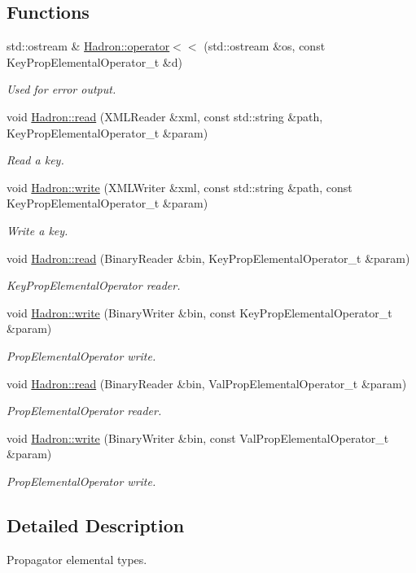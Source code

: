 \subsection*{Functions}
\begin{DoxyCompactItemize}
\item 
std\+::ostream \& \mbox{\hyperlink{namespaceHadron_a8fafc13cc7955fdf6c70c8c72c7b0000}{Hadron\+::operator$<$$<$}} (std\+::ostream \&os, const Key\+Prop\+Elemental\+Operator\+\_\+t \&d)
\begin{DoxyCompactList}\small\item\em Used for error output. \end{DoxyCompactList}\item 
void \mbox{\hyperlink{namespaceHadron_a3b1642acb606c69519cf7dd88a01fbfd}{Hadron\+::read}} (X\+M\+L\+Reader \&xml, const std\+::string \&path, Key\+Prop\+Elemental\+Operator\+\_\+t \&param)
\begin{DoxyCompactList}\small\item\em Read a key. \end{DoxyCompactList}\item 
void \mbox{\hyperlink{namespaceHadron_a97758f7d26a76e70e4c61d4409eff7a6}{Hadron\+::write}} (X\+M\+L\+Writer \&xml, const std\+::string \&path, const Key\+Prop\+Elemental\+Operator\+\_\+t \&param)
\begin{DoxyCompactList}\small\item\em Write a key. \end{DoxyCompactList}\item 
void \mbox{\hyperlink{namespaceHadron_ac7fbe05fdb59de181eed9428364667e3}{Hadron\+::read}} (Binary\+Reader \&bin, Key\+Prop\+Elemental\+Operator\+\_\+t \&param)
\begin{DoxyCompactList}\small\item\em Key\+Prop\+Elemental\+Operator reader. \end{DoxyCompactList}\item 
void \mbox{\hyperlink{namespaceHadron_a2d77dd144d88ef6a060cca397fb32373}{Hadron\+::write}} (Binary\+Writer \&bin, const Key\+Prop\+Elemental\+Operator\+\_\+t \&param)
\begin{DoxyCompactList}\small\item\em Prop\+Elemental\+Operator write. \end{DoxyCompactList}\item 
void \mbox{\hyperlink{namespaceHadron_aa192df4bf85988ad36b7c9b7c0c83dd3}{Hadron\+::read}} (Binary\+Reader \&bin, Val\+Prop\+Elemental\+Operator\+\_\+t \&param)
\begin{DoxyCompactList}\small\item\em Prop\+Elemental\+Operator reader. \end{DoxyCompactList}\item 
void \mbox{\hyperlink{namespaceHadron_a4e777dd6c1ccf60b80a383fd5901627b}{Hadron\+::write}} (Binary\+Writer \&bin, const Val\+Prop\+Elemental\+Operator\+\_\+t \&param)
\begin{DoxyCompactList}\small\item\em Prop\+Elemental\+Operator write. \end{DoxyCompactList}\end{DoxyCompactItemize}


\subsection{Detailed Description}
Propagator elemental types. 

